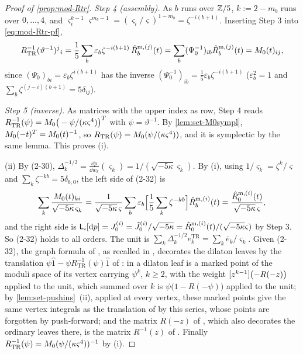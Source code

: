 \begin{proof}[Proof of \cref{prop:mod-Rtr}]
\emph{Step 4 (assembly).} As $b$ runs over $\mathbb{Z}/5$, $k:=2-m_b$ runs over $0,\dots,4$, and $\varsigma_i^{k-1}\varsigma^{m_b-1}=(\varsigma_i/\varsigma)^{1-m_b}=\zeta^{-i(b+1)}$. Inserting Step 3 into \eqref{eq:mod-Rtr-pf},
\[
R_{\mathrm{TR}}^{-1}(\vartheta^{-1})^j{}_i=\frac15\sum_b\varepsilon_b\zeta^{-i(b+1)}\,\hat{R}^{\mathrm m,(j)}_b(t)=\sum_b(\Psi_0^{-1})_{ib}\hat{R}^{\mathrm m,(j)}_b(t)=M_{0}(t)_{ij},
\]
since $(\Psi_0)_{bi}=\varepsilon_b\zeta^{i(b+1)}$ has the inverse $(\Psi_0^{-1})_{ib}=\frac15\varepsilon_b\zeta^{-i(b+1)}$ ($\varepsilon_b^2=1$ and $\sum_b\zeta^{(j-i)(b+1)}=5\delta_{ij}$).

\emph{Step 5 (inverse).} As matrices with the upper index as row, Step 4 reads $R_{\mathrm{TR}}^{-1}(\psi)=M_{0}\big(-\psi/(\kappa\varsigma^4)\big)^T$ with $\psi=\vartheta^{-1}$. By \cref{lem:set-M0sympl}, $M_{0}(-t)^T=M_{0}(t)^{-1}$, so $R_{\mathrm{TR}}(\psi)=M_{0}(\psi/(\kappa\varsigma^4))$, and it is symplectic by the same lemma. This proves (i).

(ii) By (2-30), $\Delta_k^{-1/2}=\frac{\dd p}{\dd w_k}(\varsigma_k)=1/(\sqrt{-5\kappa}\varsigma_k)$. By (i), using $1/\varsigma_k=\zeta^k/\varsigma$ and $\sum_k\zeta^{-kb}=5\delta_{b,0}$, the left side of (2-32) is
\[
\sum_k\frac{M_{0}(t)_{ki}}{\sqrt{-5\kappa}\,\varsigma_k}=\frac{1}{\sqrt{-5\kappa}\,\varsigma}\sum_b\varepsilon_b\Big[\frac15\sum_k\zeta^{-kb}\Big]\hat{R}^{\mathrm m,(i)}_b(t)=\frac{\hat{R}^{\mathrm m,(i)}_0(t)}{\sqrt{-5\kappa}\,\varsigma},
\]
and the right side is $\mathsf L_i[\mathrm{d} p]=J^{(i)}_0=\tilde J^{(i)}_0/\sqrt{-5\kappa}=\hat{R}^{\mathrm m,(i)}_0(t)/(\sqrt{-5\kappa}\varsigma)$ by Step 3. So (2-32) holds to all orders. The unit is $\sum_k\Delta_k^{-1/2}e^{\mathrm{TR}}_k=\sum_k\bar e_k/\varsigma_k$. Given (2-32), the graph formula of \cite[Thm.~4.1]{DuninBarkowski:2012bw}, as recalled in \cite[\S2.6]{Dunin-Barkowski:2015caa}, decorates the dilaton leaves by the translation $\psi\hat 1-\psi R_{\mathrm{TR}}^{-1}(\psi)\hat 1$ of \cite[Def.~2.13]{PPZ15}: in \cite[\S2.3]{DuninBarkowski:2012bw} a dilaton leaf is a marked point of the moduli space of its vertex carrying $\psi^k$, $k\geq 2$, with the weight $[z^{k-1}]\bigl(-R(-z)\bigr)$ applied to the unit, which summed over $k$ is $\psi\bigl(1-R(-\psi)\bigr)$ applied to the unit; by \cref{lem:set-pushins}~(ii), applied at every vertex, these marked points give the same vertex integrals as the translation of \cite[Def.~2.5]{PPZ15} by this series, whose points are forgotten by push-forward; and the matrix $R(-z)$ of \cite[\S2.3]{DuninBarkowski:2012bw}, which also decorates the ordinary leaves there, is the matrix $R^{-1}(z)$ of \cite[\S2.3]{Dunin-Barkowski:2015caa}. Finally $R_{\mathrm{TR}}^{-1}(\psi)=M_{0}(\psi/(\kappa\varsigma^4))^{-1}$ by (i).
\end{proof}

